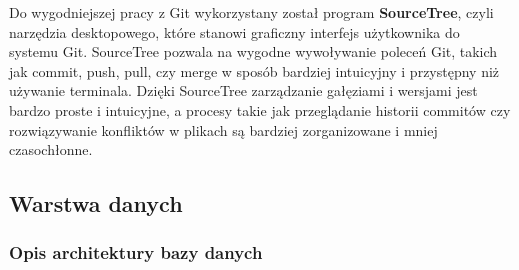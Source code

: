 \documentclass[12pt,a4paper]{article}
\begin{document}
\noindent 
Do wygodniejszej pracy z Git wykorzystany został program  \textbf{SourceTree}, czyli narzędzia desktopowego, które stanowi graficzny interfejs użytkownika do systemu Git. SourceTree pozwala na wygodne wywoływanie poleceń Git, takich jak commit, push, pull, czy merge w sposób bardziej intuicyjny i przystępny niż używanie terminala. Dzięki SourceTree zarządzanie gałęziami i wersjami jest bardzo proste i intuicyjne, a procesy takie jak przeglądanie historii commitów czy rozwiązywanie konfliktów w plikach są bardziej zorganizowane i mniej czasochłonne.

\newpage

\subsection{Warstwa danych}
\subsubsection{Opis architektury bazy danych}
\end{document}
